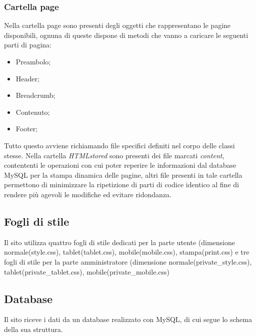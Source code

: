 \documentclass[a4paper,12pt]{article}
\begin{document}
\subsubsection{Cartella page}
Nella cartella page sono presenti degli oggetti che rappresentano le pagine disponibili, ognuna di queste dispone di metodi che vanno a caricare le seguenti parti di pagina:
\begin{itemize}
	\item Preambolo;
	\item Header;
	\item Breadcrumb;
	\item Contenuto;
	\item Footer;
\end{itemize}
Tutto questo avviene richiamando file specifici definiti nel corpo delle classi stesse. Nella cartella \textit{HTMLstored} sono presenti dei file marcati \textit{content}, contententi le operazioni con cui poter reperire le informazioni dal database MySQL per la stampa dinamica delle pagine, altri file presenti in tale cartella permettono di minimizzare la ripetizione di parti di codice identico al fine di rendere più agevoli le modifiche ed evitare ridondanza.
\subsection{Fogli di stile}
Il sito utilizza quattro fogli di stile dedicati per la parte utente (dimensione normale(style.css), tablet(tablet.css), mobile(mobile.css), stampa(print.css) e tre fogli di stile per la parte amministratore (dimensione normale(private\_style.css), tablet(private\_tablet.css), mobile(private\_mobile.css)
\newpage
\subsection{Database}
Il sito riceve i dati da un database realizzato con MySQL, di cui segue lo schema della sua struttura.
\end{document}
